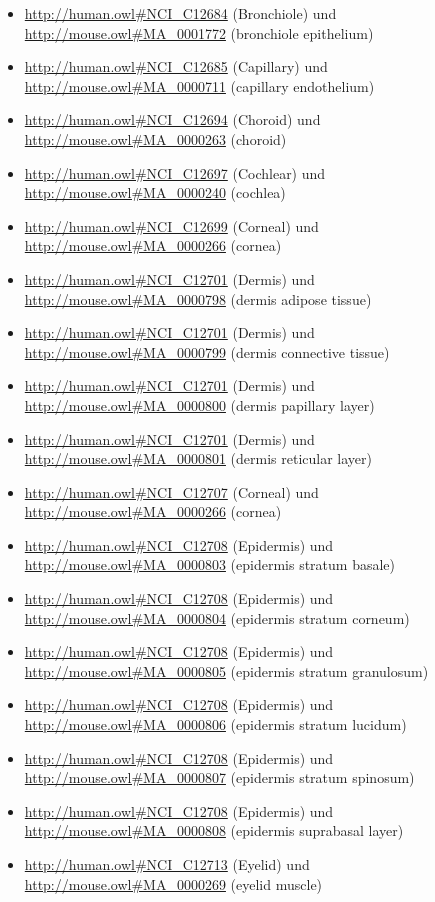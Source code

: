 \begin{itemize}
	\item \url{http://human.owl#NCI_C12684} (Bronchiole) und \url{http://mouse.owl#MA_0001772} (bronchiole epithelium)
	\item \url{http://human.owl#NCI_C12685} (Capillary) und \url{http://mouse.owl#MA_0000711} (capillary endothelium)
	\item \url{http://human.owl#NCI_C12694} (Choroid\textunderscorePlexus) und \url{http://mouse.owl#MA_0000263} (choroid)
	\item \url{http://human.owl#NCI_C12697} (Cochlear\textunderscoreNerve) und \url{http://mouse.owl#MA_0000240} (cochlea)
	\item \url{http://human.owl#NCI_C12699} (Corneal\textunderscoreStroma) und \url{http://mouse.owl#MA_0000266} (cornea)
	\item \url{http://human.owl#NCI_C12701} (Dermis) und \url{http://mouse.owl#MA_0000798} (dermis adipose tissue)
	\item \url{http://human.owl#NCI_C12701} (Dermis) und \url{http://mouse.owl#MA_0000799} (dermis connective tissue)
	\item \url{http://human.owl#NCI_C12701} (Dermis) und \url{http://mouse.owl#MA_0000800} (dermis papillary layer)
	\item \url{http://human.owl#NCI_C12701} (Dermis) und \url{http://mouse.owl#MA_0000801} (dermis reticular layer)
	\item \url{http://human.owl#NCI_C12707} (Corneal\textunderscoreEndothelium) und \url{http://mouse.owl#MA_0000266} (cornea)
	\item \url{http://human.owl#NCI_C12708} (Epidermis) und \url{http://mouse.owl#MA_0000803} (epidermis stratum basale)
	\item \url{http://human.owl#NCI_C12708} (Epidermis) und \url{http://mouse.owl#MA_0000804} (epidermis stratum corneum)
	\item \url{http://human.owl#NCI_C12708} (Epidermis) und \url{http://mouse.owl#MA_0000805} (epidermis stratum granulosum)
	\item \url{http://human.owl#NCI_C12708} (Epidermis) und \url{http://mouse.owl#MA_0000806} (epidermis stratum lucidum)
	\item \url{http://human.owl#NCI_C12708} (Epidermis) und \url{http://mouse.owl#MA_0000807} (epidermis stratum spinosum)
	\item \url{http://human.owl#NCI_C12708} (Epidermis) und \url{http://mouse.owl#MA_0000808} (epidermis suprabasal layer)
	\item \url{http://human.owl#NCI_C12713} (Eyelid) und \url{http://mouse.owl#MA_0000269} (eyelid muscle)

\end{itemize}
